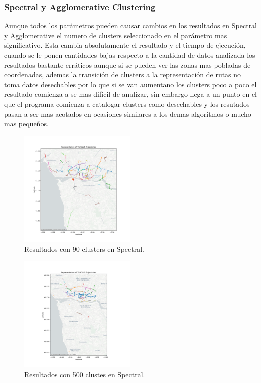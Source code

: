 \subsubsection{Spectral y Agglomerative Clustering}

Aunque todos los parámetros pueden causar cambios en los resultados en Spectral y Agglomerative el numero de clusters seleccionado en el parámetro mas significativo. Esta cambia absolutamente el resultado y el tiempo de ejecución, cuando se le ponen cantidades bajas respecto a la cantidad de datos analizada los resultados bastante erráticos aunque si se pueden ver las zonas mas pobladas de coordenadas, ademas la transición de clusters a la representación de rutas no toma datos desechables por lo que si se van aumentano los clusters poco a poco el resultado comienza a se mas difícil de analizar, sin embargo llega a un punto en el que el programa comienza a catalogar clusters como desechables y los resutados pasan a ser mas acotados en ocasiones similares a los demas algoritmos o mucho mas pequeños.

\begin{figure}[h!]
    \centering
    \includegraphics[width=0.5\textwidth]{img/Taxis/map_spect_90.png}
    \caption{Resultados con 90 clusters en Spectral.}
    \label{fig:spectral_90}
\end{figure}

\begin{figure}[h!]
    \centering
    \includegraphics[width=0.5\textwidth]{img/Taxis/map_spect_500.png}
    \caption{Resultados con 500 clustes en Spectral.}
    \label{fig:spetral_500}
\end{figure}

